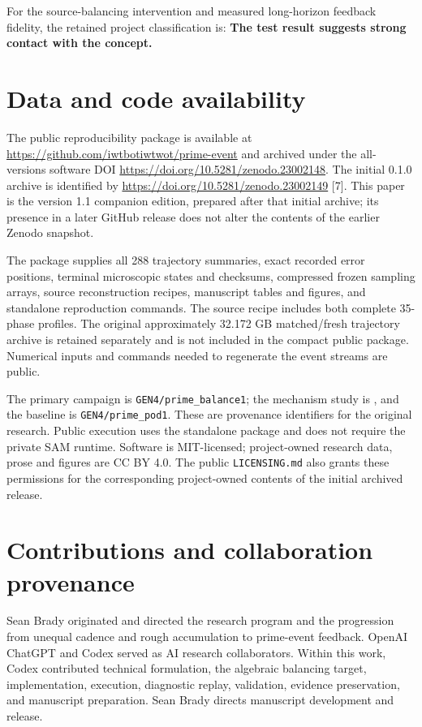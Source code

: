 \documentclass[
  11pt,
]{article}
\begin{document}
For the source-balancing intervention and measured long-horizon feedback
fidelity, the retained project classification is: \textbf{The test
result suggests strong contact with the concept.}

\section{Data and code availability}\label{data-and-code-availability}

The public reproducibility package is available at
\url{https://github.com/iwtbotiwtwot/prime-event} and archived under the
all-versions software DOI \url{https://doi.org/10.5281/zenodo.23002148}.
The initial 0.1.0 archive is identified by
\url{https://doi.org/10.5281/zenodo.23002149} {[}7{]}. This paper is the
version 1.1 companion edition, prepared after that initial archive; its
presence in a later GitHub release does not alter the contents of the
earlier Zenodo snapshot.

The package supplies all 288 trajectory summaries, exact recorded error
positions, terminal microscopic states and checksums, compressed frozen
sampling arrays, source reconstruction recipes, manuscript tables and
figures, and standalone reproduction commands. The source recipe
includes both complete 35-phase profiles. The original approximately
32.172 GB matched/fresh trajectory archive is retained separately and is
not included in the compact public package. Numerical inputs and
commands needed to regenerate the event streams are public.

The primary campaign is \texttt{GEN4/prime\_balance1}; the mechanism
study is \texttt{}, and the baseline is
\texttt{GEN4/prime\_pod1}. These are provenance identifiers for the
original research. Public execution uses the standalone package and does
not require the private SAM runtime. Software is MIT-licensed;
project-owned research data, prose and figures are CC BY 4.0. The public
\texttt{LICENSING.md} also grants these permissions for the
corresponding project-owned contents of the initial archived release.

\section{Contributions and collaboration
provenance}\label{contributions-and-collaboration-provenance}

Sean Brady originated and directed the research program and the
progression from unequal cadence and rough accumulation to prime-event
feedback. OpenAI ChatGPT and Codex served as AI research collaborators.
Within this work, Codex contributed technical formulation, the algebraic
balancing target, implementation, execution, diagnostic replay,
validation, evidence preservation, and manuscript preparation. Sean
Brady directs manuscript development and release.
\end{document}
